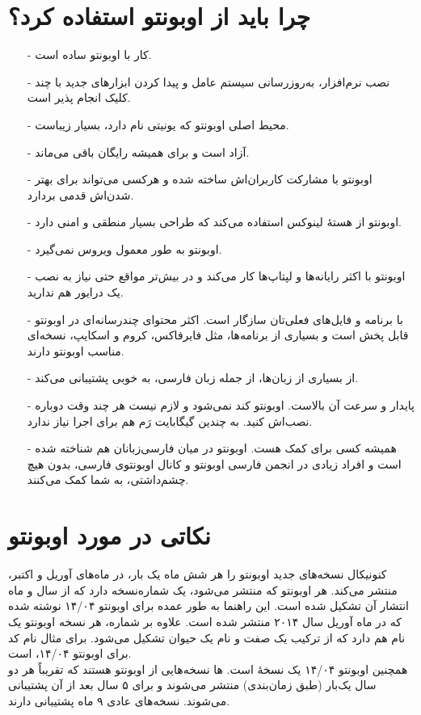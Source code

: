 \section{چرا باید از اوبونتو استفاده کرد؟}
\begin{itemize}
\item[-] کار با اوبونتو ساده است.
\item[-] نصب نرم‌افزار، به‌روزرسانی سیستم عامل و پیدا کردن ابزارهای جدید با چند کلیک انجام پذیر است.
\item[-] محیط اصلی اوبونتو که یونیتی نام دارد، بسیار زیباست.
\item[-] آزاد است و برای همیشه رایگان باقی می‌ماند.
\item[-] اوبونتو با مشارکت کاربران‌اش ساخته شده و هرکسی می‌تواند برای بهتر شدن‌اش قدمی بردارد.
\item[-] اوبونتو از هستهٔ لینوکس استفاده می‌کند که طراحی بسیار منطقی و امنی دارد.
\item[-] اوبونتو به طور معمول ویروس نمی‌گیرد.
\item[-] اوبونتو با اکثر رایانه‌ها و لپتاپ‌ها کار می‌کند و در بیش‌تر مواقع حتی نیاز به نصب یک درایور هم ندارید.
\item[-] با برنامه و فایل‌های فعلی‌تان سازگار است. اکثر محتوای چندرسانه‌ای در اوبونتو قابل پخش است و بسیاری از برنامه‌ها، مثل فایرفاکس، کروم و اسکایپ، نسخه‌ای مناسب اوبونتو دارند.
\item[-] از بسیاری از زبان‌ها، از جمله زبان فارسی، به خوبی پشتیبانی می‌کند.
\item[-] پایدار و سرعت آن بالاست. اوبونتو کند نمی‌شود و لازم نیست هر چند وقت دوباره نصب‌اش کنید. به چندین گیگابایت رَم هم برای اجرا نیاز ندارد.
\item[-] همیشه کسی برای کمک هست. اوبونتو در میان فارسی‌زبانان هم شناخته شده است و افراد زیادی در انجمن فارسی اوبونتو و کانال  اوبونتوی فارسی، بدون هیچ چشم‌داشتی، به شما کمک می‌کنند.

\end{itemize}

\section{نکاتی در مورد اوبونتو}
کنونیکال نسخه‌های جدید اوبونتو را هر شش ماه یک بار، در ماه‌های آوریل و اکتبر، منتشر می‌کند. هر اوبونتو که منتشر می‌شود، یک شماره‌نسخه دارد که از سال و ماه انتشار آن تشکیل شده است. این راهنما به طور عمده برای اوبونتو ۱۴/۰۴ نوشته شده که در ماه آوریل سال ۲۰۱۴ منتشر شده است.
علاوه بر شماره، هر نسخه اوبونتو یک نام هم دارد که از ترکیب یک صفت و نام یک حیوان تشکیل می‌شود. برای مثال نام کد برای اوبونتو ۱۴/۰۴،  است.\\ همچنین اوبونتو ۱۴/۰۴ یک نسخهٔ  است.  ها نسخه‌هایی از اوبونتو هستند که تقریباً هر دو سال یک‌بار (طبق زمان‌بندی) منتشر می‌شوند و برای ۵ سال بعد از آن پشتیبانی می‌شوند. نسخه‌های عادی ۹ ماه پشتیبانی دارند.\\
